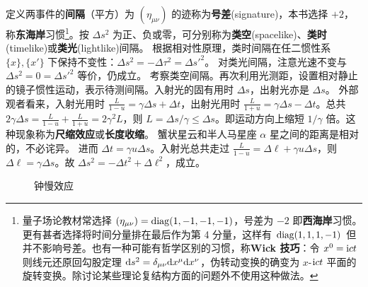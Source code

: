 定义两事件的\textbf{间隔}（平方）为
$(\eta_{\mu\nu})$ 的迹称为\textbf{号差}(signature)，本书选择 $+2$，称\textbf{东海岸}习惯\footnote{量子场论教材常选择 $(\eta_{\mu\nu})=\operatorname{diag}(1,-1,-1,-1)$，号差为 $-2$ 即\textbf{西海岸}习惯。更有甚者选择将时间分量排在最后作为第 4 分量，这样有 $\operatorname{diag}(1,1,1,-1)$ 但并不影响号差。也有一种可能有哲学区别的习惯，称\textbf{Wick 技巧}：令 $x^0=\mathrm{i} ct$ 则线元还原回勾股定理 $\dd s^2= \delta_{\mu\nu}\dd x^\mu\dd x^\nu$，伪转动变换的确变为 $x$-$\mathrm{i} ct$ 平面的旋转变换。除讨论某些理论复结构方面的问题外不使用这种做法。}。按 $\Delta s^2$ 为正、负或零，可分别称为\textbf{类空}(spacelike)、\textbf{类时}(timelike)或\textbf{类光}(lightlike)间隔。
根据相对性原理，类时间隔在任二惯性系 $\{x\},\{x'\}$ 下保持不变性：$\Delta s^2=-\Delta\tau^2=\Delta s'^2$。
对类光间隔，注意光速不变与 $\Delta s^2=0=\Delta s'^2$ 等价，仍成立。
考察类空间隔。再次利用光测距，设置相对静止的镜子惯性运动，表示待测间隔。入射光的固有用时 $\Delta s$，出射光亦是 $\Delta s$。
外部观者看来，入射光用时 $\frac{L}{1-u}=\gamma\Delta s+\Delta t$，出射光用时 $\frac{L}{1+u}=\gamma\Delta s-\Delta t$。总共 $2\gamma\Delta s=\frac{L}{1-u}+\frac{L}{1+u}=2\gamma^2L$，则 $L=\Delta s/\gamma\leqslant\Delta s$。即运动方向上缩短 $1/\gamma$ 倍。这种现象称为\textbf{尺缩效应}或\textbf{长度收缩}。
蟹状星云和半人马星座 $\alpha$ 星之间的距离是相对的，不必诧异。
进而 $\Delta t=\gamma u\Delta s$。入射光总共走过 $\frac{L}{1-u}=\Delta\ell+\gamma u\Delta s$，则 $\Delta\ell = \gamma\Delta s$。故 $\Delta s^2=-\Delta t^2+\Delta\ell^2$，成立。

    \begin{figure}[t]
        \centering
        \qquad
        \caption{钟慢效应}
    \end{figure}

